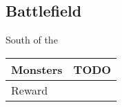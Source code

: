 \subsection{Battlefield}
\label{map:battlefield_16}

South of the 

\noindent\begin{tabularx}{\textwidth}[l]{lX}
	Monsters
	& TODO
\\ \hline
	Reward & \nameref{spell:thunder}
\end{tabularx}
